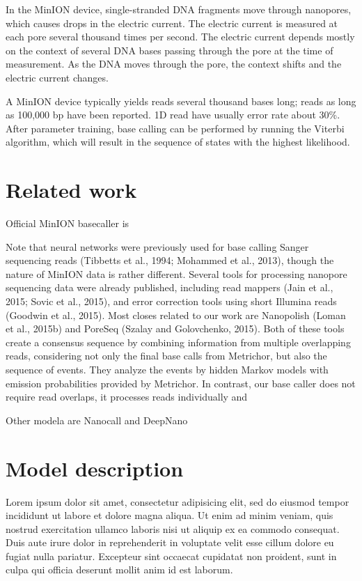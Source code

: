 \documentclass[times, utf8, seminar]{fer}
\begin{document}
In the MinION device, single-stranded DNA fragments move through nanopores, which causes drops in the electric current. The electric current is measured at each pore several thousand times per second. The electric current depends mostly on the context of several DNA bases passing through the pore at the time of measurement. As the DNA moves through the pore, the context shifts and the electric current changes.

A MinION device typically yields reads several thousand bases long; reads as long as 100,000 bp have been reported. 1D read have usually error rate about   30\%. After parameter training, base calling can be performed by running the Viterbi algorithm, which will result in the sequence of states with the highest likelihood.

\chapter{Related work}

Official MinION basecaller is

Note that neural networks were previously used for base calling Sanger sequencing reads (Tibbetts et al., 1994; Mohammed et al., 2013), though the nature of MinION data is rather different. Several tools for processing nanopore sequencing data were already published, including read mappers (Jain et al., 2015; Sovic et al., 2015), and error correction tools using short Illumina reads (Goodwin et al., 2015). Most closes related to our work are Nanopolish (Loman et al., 2015b) and PoreSeq (Szalay and Golovchenko, 2015). Both of these tools create a consensus sequence by combining information from multiple overlapping reads, considering not only the final base calls from Metrichor, but also the sequence of events. They analyze the events by hidden Markov models with emission probabilities provided by Metrichor. In contrast, our base caller does not require read overlaps, it processes reads individually and

Other modela are Nanocall \cite{nanocall} and DeepNano \cite{deepnano}

\chapter{Model description}
Lorem ipsum dolor sit amet, consectetur adipisicing elit, sed do eiusmod tempor incididunt ut labore et dolore magna aliqua. Ut enim ad minim veniam, quis nostrud exercitation ullamco laboris nisi ut aliquip ex ea commodo consequat. Duis aute irure dolor in reprehenderit in voluptate velit esse cillum dolore eu fugiat nulla pariatur. Excepteur sint occaecat cupidatat non proident, sunt in culpa qui officia deserunt mollit anim id est laborum.
\end{document}
